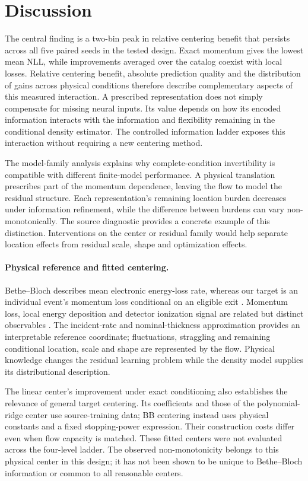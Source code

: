 \documentclass[11pt]{article}
\begin{document}
\section{Discussion}
\label{sec:discussion}

The central finding is a two-bin peak in relative centering benefit that
persists across all five paired seeds in the tested design. Exact momentum
gives the lowest mean NLL, while improvements averaged over the catalog
coexist with local losses. Relative centering benefit, absolute prediction
quality and the distribution of gains across physical conditions therefore
describe complementary aspects of this measured interaction. A prescribed representation does not simply compensate
for missing neural inputs. Its value depends on how its encoded information
interacts with the information and flexibility remaining in the conditional
density estimator. The controlled information ladder exposes this interaction
without requiring a new centering method.

The model-family analysis explains why complete-condition invertibility is
compatible with different finite-model performance. A physical translation
prescribes part of the momentum dependence, leaving the flow to model the
residual structure. Each representation's remaining location burden decreases
under information refinement, while the difference between burdens can vary
non-monotonically. The source diagnostic provides a concrete example of this
distinction. Interventions on the center or residual family would help
separate location effects from residual scale, shape and optimization effects.

\paragraph{Physical reference and fitted centering.}
Bethe--Bloch describes mean electronic energy-loss rate, whereas our target
is an individual event's momentum loss conditional on an eligible exit
\citep{PDG2025,Bichsel1988}. Momentum loss, local energy deposition and
detector ionization signal are related but distinct observables
\citep{Bichsel2006}. The incident-rate and nominal-thickness approximation
provides an interpretable reference coordinate; fluctuations, straggling and
remaining conditional location, scale and shape are represented by the flow.
Physical knowledge changes the residual learning problem while the density
model supplies its distributional description.

The linear center's improvement under exact conditioning also establishes
the relevance of general target centering. Its coefficients and those of the
polynomial-ridge center use source-training data; BB centering instead uses
physical constants and a fixed stopping-power expression. Their construction
costs differ even when flow capacity is matched. These fitted centers were
not evaluated across the four-level ladder. The observed non-monotonicity
belongs to this physical center in this design; it has not been shown to be
unique to Bethe--Bloch information or common to all reasonable centers.
\end{document}
